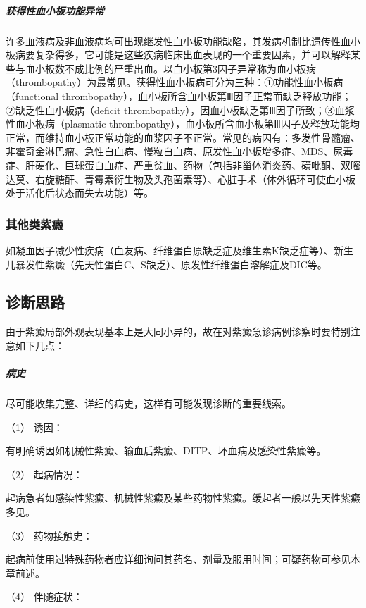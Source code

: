 \subparagraph{获得性血小板功能异常}

许多血液病及非血液病均可出现继发性血小板功能缺陷，其发病机制比遗传性血小板病要复杂得多，它可能是这些疾病临床出血表现的一个重要因素，并可以解释某些与血小板数不成比例的严重出血。以血小板第3因子异常称为血小板病（thrombopathy）为最常见。获得性血小板病可分为三种：①功能性血小板病（functional
thrombopathy），血小板所含血小板第Ⅲ因子正常而缺乏释放功能；②缺乏性血小板病（deficit
thrombopathy），因血小板缺乏第Ⅲ因子所致；③血浆性血小板病（plasmatic
thrombopathy），血小板所含血小板第Ⅲ因子及释放功能均正常，而维持血小板正常功能的血浆因子不正常。常见的病因有：多发性骨髓瘤、非霍奇金淋巴瘤、急性白血病、慢粒白血病、原发性血小板增多症、MDS、尿毒症、肝硬化、巨球蛋白血症、严重贫血、药物（包括非甾体消炎药、磺吡酮、双嘧达莫、右旋糖酐、青霉素衍生物及头孢菌素等）、心脏手术（体外循环可使血小板处于活化后状态而失去功能）等。

\subsubsection{其他类紫癜}

如凝血因子减少性疾病（血友病、纤维蛋白原缺乏症及维生素K缺乏症等）、新生儿暴发性紫癜（先天性蛋白C、S缺乏）、原发性纤维蛋白溶解症及DIC等。

\subsection{诊断思路}

由于紫癜局部外观表现基本上是大同小异的，故在对紫癜急诊病例诊察时要特别注意如下几点：

\subparagraph{病史}

尽可能收集完整、详细的病史，这样有可能发现诊断的重要线索。

\hypertarget{text00036.htmlux5cux23CHP1-14-2-1-1}{}
（1） 诱因：

有明确诱因如机械性紫癜、输血后紫癜、DITP、坏血病及感染性紫癜等。

\hypertarget{text00036.htmlux5cux23CHP1-14-2-1-2}{}
（2） 起病情况：

起病急者如感染性紫癜、机械性紫癜及某些药物性紫癜。缓起者一般以先天性紫癜多见。

\hypertarget{text00036.htmlux5cux23CHP1-14-2-1-3}{}
（3） 药物接触史：

起病前使用过特殊药物者应详细询问其药名、剂量及服用时间；可疑药物可参见本章前述。

\hypertarget{text00036.htmlux5cux23CHP1-14-2-1-4}{}
（4） 伴随症状：

